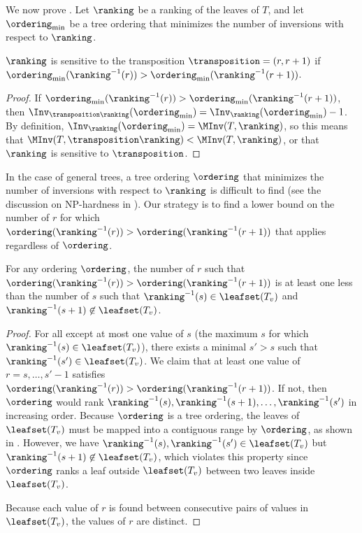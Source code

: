 \documentclass{toc}
\begin{document}
We now prove . Let $\ranking$ be a ranking of the leaves of $T$, and let $\ordering_{\min}$ be a tree ordering that minimizes the number of inversions with respect to $\ranking$.

\begin{claim}
    \label{claim:k-ary:decreasing-transposition}
    $\ranking$ is sensitive to the transposition $\transposition=(r,r+1)$ if $\ordering_{\min}(\ranking^{-1}(r))>\ordering_{\min}(\ranking^{-1}(r+1))$.
\end{claim}

\begin{proof}
    If $\ordering_{\min}(\ranking^{-1}(r))>\ordering_{\min}(\ranking^{-1}(r+1))$, then $\Inv_{\transposition \ranking}(\ordering_{\min})=\Inv_{\ranking}(\ordering_{\min})-1$. By definition, $\Inv_{\ranking}(\ordering_{\min})=\MInv(T,\ranking)$, so this means that $\MInv(T,\transposition \ranking)< \MInv(T,\ranking)$, or that $\ranking$ is sensitive to $\transposition$.
\end{proof}

In the case of general trees, a tree ordering $\ordering$ that minimizes the number of inversions with respect to $\ranking$ is difficult to find (see the discussion on NP-hardness in ). Our strategy is to find a lower bound on the number of $r$ for which $\ordering(\ranking^{-1}(r))>\ordering(\ranking^{-1}(r+1))$ that applies regardless of $\ordering$.

\begin{claim}
    \label{claim:k-ary:transposition-to-gap}
    For any ordering $\ordering$, the number of $r$ such that $\ordering(\ranking^{-1}(r))>\ordering(\ranking^{-1}(r+1))$ is at least one less than the number of $s$ such that $\ranking^{-1}(s)\in \leafset(T_v)$ and $\ranking^{-1}(s+1)\not\in \leafset(T_v)$.
\end{claim}

\begin{proof}
    For all except at most one value of $s$ (the maximum $s$ for which $\ranking^{-1}(s)\in \leafset(T_v)$), there exists a minimal $s'>s$ such that $\ranking^{-1}(s')\in \leafset(T_v)$. We claim that at least one value of $r=s,\dots,s'-1$ satisfies $\ordering(\ranking^{-1}(r))>\ordering(\ranking^{-1}(r+1))$. If not, then $\ordering$ would rank $\ranking^{-1}(s),\ranking^{-1}(s+1),\dots,\ranking^{-1}(s')$ in increasing order. Because $\ordering$ is a tree ordering, the leaves of $\leafset(T_v)$ must be mapped into a contiguous range by $\ordering$, as shown in . However, we have $\ranking^{-1}(s),\ranking^{-1}(s')\in \leafset(T_v)$ but $\ranking^{-1}(s+1)\not\in \leafset(T_v)$, which violates this property since $\ordering$ ranks a leaf outside $\leafset(T_v)$ between two leaves inside $\leafset(T_v)$.
    
    Because each value of $r$ is found between consecutive pairs of values in $\leafset(T_v)$, the values of $r$ are distinct.
\end{proof}
\end{document}
